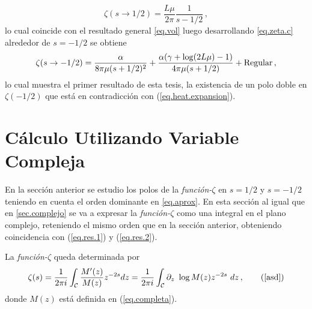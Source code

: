 \begin{equation}\label{eq.res.2}
    \zeta  (s \rightarrow 1/2) = \frac{L \mu }{2 \pi} \frac{1}{s-1/2}    
    	\, ,
\end{equation}
lo cual coincide con el resultado general \ref{eq.vol} luego desarrollando \ref{eq.zeta.c} alrededor de $s=-1/2$ se obtiene
\begin{equation}\label{eq.res.1}
    \zeta  (s \rightarrow -1/2 ) =  \frac{\alpha}{8  \pi \mu (s+1/2)^2} +
    \frac{ \alpha ( \gamma  +  \log (2L \mu ) -1 ) }{4  \pi \mu (s+1/2) }  + 
    {\rm Regular}
    	\, ,
\end{equation}
lo cual muestra el primer resultado de esta tesis, la existencia de un polo doble en $\zeta(-1/2)$ que está en contradicción con (\ref{eq.heat.expansion}).

\section{Cálculo Utilizando Variable Compleja}


En la sección anterior se estudio los polos de la {\it función-$\zeta$} en $s=1/2$ y $s=-1/2$ teniendo en cuenta el orden dominante en \ref{eq.aprox}.
En esta sección al igual que en \ref{sec.complejo} se va a expresar la {\it función-$\zeta $} como una integral en el plano complejo, reteniendo el mismo orden que en la sección anterior, obteniendo coincidencia con (\ref{eq.res.1}) y (\ref{eq.res.2}).


La {\it función-$ \zeta$} queda determinada por
\begin{equation}
\zeta (s) = 
\frac{1}{2 \pi i} 
\int _{\mathcal{C}}
\frac{M ' ( z ) }{ M ( z ) } z ^{-2s} d z = 
\frac{1}{2 \pi i} 
\int _{\mathcal{C}}
\partial _z \ \log 	M(z)  z ^{-2s} \ dz
	\, ,
	\tag{\ref{asd}}
\end{equation}
donde $M (z)$ está definida en (\ref{eq.completa}).


